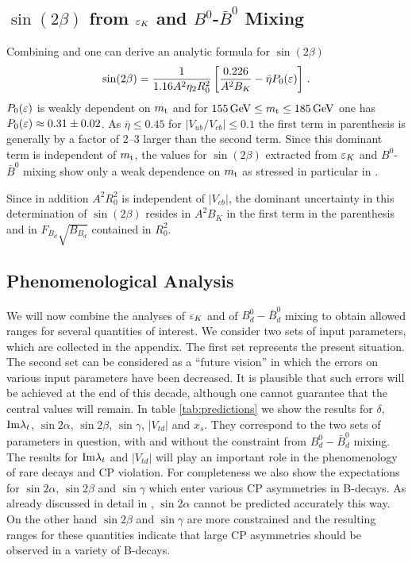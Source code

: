 \subsection{$\sin(2\beta)$ from $\varepsilon_K$ and $B^0$-$\bar B^0$ Mixing}
           \label{subsec:sin2bepskBB}
Combining  and  one can derive an analytic
formula for $\sin(2\beta)$ \cite{burasetal:94b}
\begin{equation}
\sin(2\beta) = \frac{1}{1.16 A^2 \eta_2 R_0^2}
\left[ \frac{0.226}{A^2 B_K} - \bar\eta P_0(\varepsilon) \right] \, .
\label{eq:sin2b}
\end{equation}
$P_0(\varepsilon)$ is weakly dependent on $m_{\rm t}$ and for $155\, {\rm GeV} \le m_{\rm t} \le
185\, {\rm GeV}$ one has $P_0(\varepsilon) \approx 0.31 \pm 0.02$. As $\bar\eta \le
0.45$ for $|V_{ub}/V_{cb}| \le 0.1$ the first term in parenthesis is
generally by a factor of 2--3 larger than the second term. Since this
dominant term is independent of $m_{\rm t}$, the values for $\sin(2\beta)$
extracted from $\varepsilon_K$ and $B^0$-$\bar B^0$ mixing show only a weak
dependence on $m_{\rm t}$ as stressed in particular in \cite{rosner:00}.

Since in addition $A^2 R_0^2$ is independent of $|V_{cb}|$, the dominant
uncertainty in this determination of $\sin(2\beta)$ resides in $A^2 B_K$
in the first term in the parenthesis and in $F_{B_d} \sqrt{B_{B_d}}$
contained in $R_0^2$.

\subsection{Phenomenological Analysis}
           \label{subsec:phenoUT}
We will now combine the analyses of $\varepsilon_K$ and of $B^0_d-\bar B^0_d$
mixing to obtain allowed ranges for several quantities of interest. We
consider two sets of input parameters, which are collected in the
appendix. The first set represents the present situation. The second
set can be considered as a ``future vision'' in which the errors on
various input parameters have been decreased. It is plausible that such
errors will be achieved at the end of this decade, although one cannot
guarantee that the central values will remain. In table
\ref{tab:predictions} we show the results for $\delta$, ${\rm Im}\lambda_t$,
$\sin 2\alpha$, $\sin 2\beta$, $\sin \gamma$, $|V_{td}|$ and $x_s$.
They correspond to the two sets of parameters in question, with and
without the constraint from $B^0_d-\bar B^0_d$ mixing. The results for
${\rm Im}\lambda_t$ and $|V_{td}|$ will play an important role in the
phenomenology of rare decays and CP violation.  For completeness we
also show the expectations for $\sin 2\alpha$, $\sin 2\beta$ and
$\sin\gamma$ which enter various CP asymmetries in B-decays. As already
discussed in detail in \cite{burasetal:94b}, $\sin 2\alpha$ cannot be
predicted accurately this way.  On the other hand $\sin 2\beta$ and
$\sin\gamma$ are more constrained and the resulting ranges for these
quantities indicate that large CP asymmetries should be observed in a
variety of B-decays.

